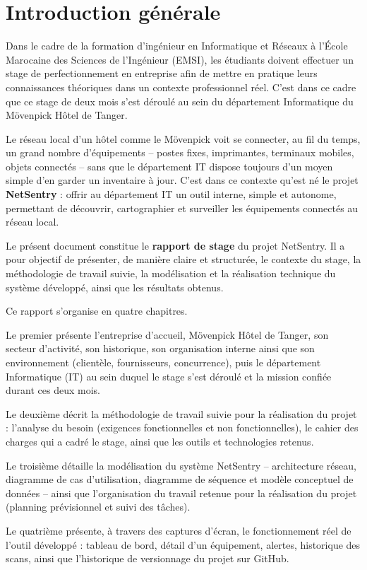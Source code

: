 \chapter*{Introduction générale}

Dans le cadre de la formation d'ingénieur en Informatique et Réseaux à l'École Marocaine
des Sciences de l'Ingénieur (EMSI), les étudiants doivent effectuer un stage de
perfectionnement en entreprise afin de mettre en pratique leurs connaissances théoriques
dans un contexte professionnel réel. C'est dans ce cadre que ce stage de deux mois s'est
déroulé au sein du département Informatique du Mövenpick Hôtel de Tanger.

Le réseau local d'un hôtel comme le Mövenpick voit se connecter, au fil du temps, un
grand nombre d'équipements -- postes fixes, imprimantes, terminaux mobiles, objets
connectés -- sans que le département IT dispose toujours d'un moyen simple d'en garder
un inventaire à jour. C'est dans ce contexte qu'est né le projet \textbf{NetSentry} :
offrir au département IT un outil interne, simple et autonome, permettant de découvrir,
cartographier et surveiller les équipements connectés au réseau local.

Le présent document constitue le \textbf{rapport de stage} du projet NetSentry. Il a
pour objectif de présenter, de manière claire et structurée, le contexte du stage, la
méthodologie de travail suivie, la modélisation et la réalisation technique du système
développé, ainsi que les résultats obtenus.

Ce rapport s'organise en quatre chapitres.

Le premier présente l'entreprise d'accueil, Mövenpick Hôtel de Tanger, son secteur
d'activité, son historique, son organisation interne ainsi que son environnement
(clientèle, fournisseurs, concurrence), puis le département Informatique (IT) au sein
duquel le stage s'est déroulé et la mission confiée durant ces deux mois.

Le deuxième décrit la méthodologie de travail suivie pour la réalisation du projet :
l'analyse du besoin (exigences fonctionnelles et non fonctionnelles), le cahier des
charges qui a cadré le stage, ainsi que les outils et technologies retenus.

Le troisième détaille la modélisation du système NetSentry -- architecture réseau,
diagramme de cas d'utilisation, diagramme de séquence et modèle conceptuel de données --
ainsi que l'organisation du travail retenue pour la réalisation du projet (planning
prévisionnel et suivi des tâches).

Le quatrième présente, à travers des captures d'écran, le fonctionnement réel de
l'outil développé : tableau de bord, détail d'un équipement, alertes, historique des
scans, ainsi que l'historique de versionnage du projet sur GitHub.
